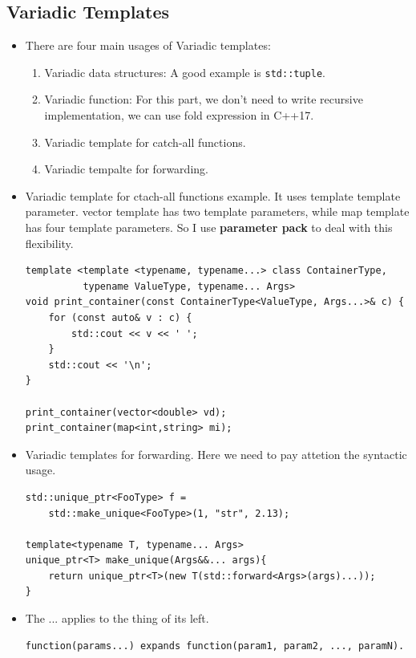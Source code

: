 \documentclass[a4paper,11pt,twoside]{book}
\begin{document}
\subsection{Variadic Templates}
\begin{itemize}
    \item There are four main usages of Variadic templates:
        \begin{enumerate}
            \item Variadic data structures: A good example is \texttt{std::tuple}.
            \item Variadic function: For this part, we don't need to write recursive implementation, we can use fold expression in C++17.
            \item Variadic template for catch-all functions. 
            \item Variadic tempalte for forwarding.
        \end{enumerate}

    \item Variadic template for ctach-all functions example. It uses template template parameter. vector template has two template parameters, while map template has four template parameters. So I use \textbf{parameter pack} to deal with this flexibility.

\begin{lstlisting}
template <template <typename, typename...> class ContainerType,
          typename ValueType, typename... Args>
void print_container(const ContainerType<ValueType, Args...>& c) {
    for (const auto& v : c) {
        std::cout << v << ' ';
    }
    std::cout << '\n';
}

print_container(vector<double> vd);
print_container(map<int,string> mi);
\end{lstlisting}

    \item Variadic templates for forwarding. Here we need to pay attetion the syntactic usage. 
\begin{lstlisting}
std::unique_ptr<FooType> f = 
	std::make_unique<FooType>(1, "str", 2.13);

template<typename T, typename... Args>
unique_ptr<T> make_unique(Args&&... args){
	return unique_ptr<T>(new T(std::forward<Args>(args)...));
}
\end{lstlisting}
    \item The ... applies to the thing of its left.
\begin{lstlisting}
function(params...) expands function(param1, param2, ..., paramN).


\end{lstlisting}
\end{itemize}
\end{document}
